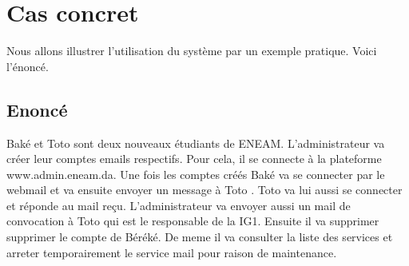 \documentclass[a4paper,12pt,french]{report} %
\begin{document}
\section{Cas concret}
Nous allons illustrer l'utilisation du système par un exemple pratique. Voici l'énoncé.
\subsection{Enoncé}
Baké et Toto sont deux nouveaux étudiants de ENEAM. L'administrateur va créer leur comptes emails respectifs. Pour cela, il se connecte à la plateforme www.admin.eneam.da. Une fois les comptes créés Baké va se connecter par le webmail et va ensuite envoyer un message à Toto . Toto va lui aussi se connecter et réponde au mail reçu. L'administrateur va envoyer aussi un mail de convocation à Toto qui est le responsable de la IG1. Ensuite il va supprimer supprimer le compte de Béréké. De meme il va consulter la liste des services et arreter temporairement le service mail pour raison de maintenance.
\end{document}
